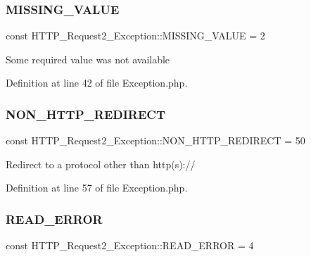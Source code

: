 \subsubsection{\texorpdfstring{M\+I\+S\+S\+I\+N\+G\+\_\+\+V\+A\+L\+UE}{MISSING\_VALUE}}
{\footnotesize\ttfamily const H\+T\+T\+P\+\_\+\+Request2\+\_\+\+Exception\+::\+M\+I\+S\+S\+I\+N\+G\+\_\+\+V\+A\+L\+UE = 2}

Some required value was not available 

Definition at line 42 of file Exception.\+php.

\hypertarget{classHTTP__Request2__Exception_a9e2ad085db3df15cf825d54e14086b98}{}\label{classHTTP__Request2__Exception_a9e2ad085db3df15cf825d54e14086b98} 
\subsubsection{\texorpdfstring{N\+O\+N\+\_\+\+H\+T\+T\+P\+\_\+\+R\+E\+D\+I\+R\+E\+CT}{NON\_HTTP\_REDIRECT}}
{\footnotesize\ttfamily const H\+T\+T\+P\+\_\+\+Request2\+\_\+\+Exception\+::\+N\+O\+N\+\_\+\+H\+T\+T\+P\+\_\+\+R\+E\+D\+I\+R\+E\+CT = 50}

Redirect to a protocol other than http(s)\+:// 

Definition at line 57 of file Exception.\+php.

\hypertarget{classHTTP__Request2__Exception_a9167d1901f61ab9f5ec9271b41fe340e}{}\label{classHTTP__Request2__Exception_a9167d1901f61ab9f5ec9271b41fe340e} 
\subsubsection{\texorpdfstring{R\+E\+A\+D\+\_\+\+E\+R\+R\+OR}{READ\_ERROR}}
{\footnotesize\ttfamily const H\+T\+T\+P\+\_\+\+Request2\+\_\+\+Exception\+::\+R\+E\+A\+D\+\_\+\+E\+R\+R\+OR = 4}

